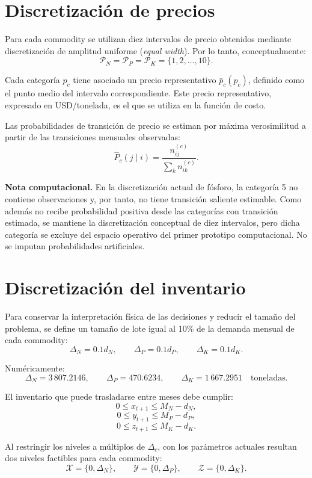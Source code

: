\documentclass[11pt]{article}
\begin{document}
\section{Discretización de precios}

Para cada commodity se utilizan diez intervalos de precio obtenidos mediante discretización de amplitud uniforme (\textit{equal width}). Por lo tanto, conceptualmente:
\[
\mathcal{P}_N=\mathcal{P}_P=\mathcal{P}_K=\{1,2,\ldots,10\}.
\]

Cada categoría $p_c$ tiene asociado un precio representativo $\bar p_c(p_c)$, definido como el punto medio del intervalo correspondiente. Este precio representativo, expresado en USD/tonelada, es el que se utiliza en la función de costo.

Las probabilidades de transición de precio se estiman por máxima verosimilitud a partir de las transiciones mensuales observadas:
\[
\widehat P_c(j\mid i)=\frac{n_{ij}^{(c)}}{\sum_k n_{ik}^{(c)}}.
\]

\textbf{Nota computacional.} En la discretización actual de fósforo, la categoría 5 no contiene observaciones y, por tanto, no tiene transición saliente estimable. Como además no recibe probabilidad positiva desde las categorías con transición estimada, se mantiene la discretización conceptual de diez intervalos, pero dicha categoría se excluye del espacio operativo del primer prototipo computacional. No se imputan probabilidades artificiales.

\section{Discretización del inventario}

Para conservar la interpretación física de las decisiones y reducir el tamaño del problema, se define un tamaño de lote igual al 10\% de la demanda mensual de cada commodity:
\[
\Delta_N=0.1d_N,\qquad
\Delta_P=0.1d_P,\qquad
\Delta_K=0.1d_K.
\]

Numéricamente:
\[
\Delta_N=3\,807.2146,\qquad
\Delta_P=470.6234,\qquad
\Delta_K=1\,667.2951\quad\text{toneladas}.
\]

El inventario que puede trasladarse entre meses debe cumplir:
\[
0\le x_{t+1}\le M_N-d_N,
\]
\[
0\le y_{t+1}\le M_P-d_P,
\]
\[
0\le z_{t+1}\le M_K-d_K.
\]

Al restringir los niveles a múltiplos de $\Delta_c$, con los parámetros actuales resultan dos niveles factibles para cada commodity:
\[
\mathcal{X}=\{0,\Delta_N\},\qquad
\mathcal{Y}=\{0,\Delta_P\},\qquad
\mathcal{Z}=\{0,\Delta_K\}.
\]
\end{document}
